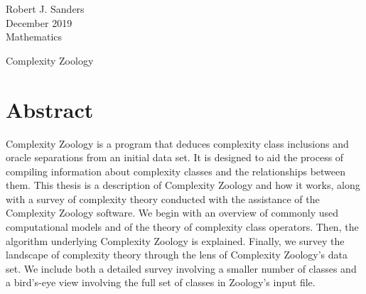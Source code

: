 {\singlespacing
   \begin{flushright}
      Robert J. Sanders \\
      December 2019 \\
      Mathematics \\
   \end{flushright}
}

\bigskip

\begin{center}
   Complexity Zoology \\
\end{center}

\section*{Abstract}

Complexity Zoology is a program that deduces complexity class inclusions and oracle 
separations from an initial data set. It is designed to aid the process of compiling 
information about complexity classes and the relationships between them.
This thesis is a description of Complexity Zoology and how it works, along with a 
survey of complexity theory conducted with the assistance of the Complexity Zoology 
software. We begin with an overview of commonly used computational models and of the
theory of complexity class operators. Then, the algorithm underlying Complexity 
Zoology is explained. Finally, we survey the landscape of complexity theory 
through the lens of Complexity Zoology's data set. We include both a detailed survey
involving a smaller number of classes and a bird's-eye view involving the full set 
of classes in Zoology's input file.

